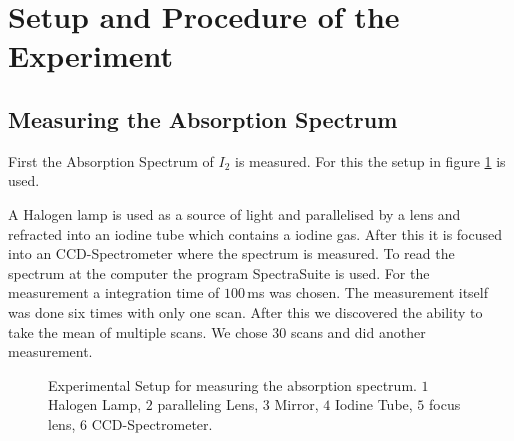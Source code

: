 \section{Setup and Procedure of the Experiment}
\subsection{Measuring the Absorption Spectrum}
First the Absorption Spectrum of $I_2$ is measured. For this the setup in figure \ref{figABS} is used.\par
A Halogen lamp is used as a source of light and parallelised by a lens and refracted into an iodine tube which contains a iodine gas. After this it is focused into an CCD-Spectrometer where the spectrum is measured. To read the spectrum at the computer the program SpectraSuite is used. For the measurement a integration time of $100$\,ms was chosen. The measurement itself was done six times with only one scan. After this we discovered the ability to take the mean of multiple scans. We chose $30$ scans and did another measurement.
\begin{figure}[ht]
	\centering
	\caption[Experimental Setup 1]{Experimental Setup for measuring the absorption spectrum. $1$ Halogen Lamp, $2$ paralleling Lens, $3$ Mirror, $4$ Iodine Tube, $5$ focus lens, $6$ CCD-Spectrometer.}
	\label{figABS}
\end{figure}
